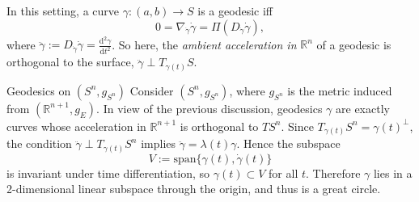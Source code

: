In this setting, a curve $\gamma:(a,b) \to S$ is a geodesic iff
\[
0 = \nabla_{\dot{\gamma}} \dot{\gamma} = \Pi(D_{\dot{\gamma}} \dot{\gamma}),
\]
where $\ddot\gamma:=D_{\dot{\gamma}} \dot{\gamma} = \frac{\mathrm{d}^2\gamma}{\mathrm{d}t^2}$. So here, the \emph{ambient acceleration in} $\mathbb{R}^n$ of a geodesic is orthogonal to the surface, $\ddot\gamma\perp T_{\gamma(t)}S$.


\begin{colexample}{Geodesics on \((S^n, g_{S^n})\)}{}
Consider \((S^n, g_{S^n})\), where \(g_{S^n}\) is the metric induced from \((\mathbb{R}^{n+1}, g_E)\). In view of the previous discussion, geodesics \(\gamma\) are exactly curves whose acceleration in \(\mathbb{R}^{n+1}\) is orthogonal to \(TS^n\). Since \(T_{\gamma(t)}S^n = \gamma(t)^\perp\), the condition \(\ddot\gamma \perp T_{\gamma(t)}S^n\) implies \(\ddot\gamma = \lambda(t)\gamma\). Hence the subspace
\[
V := \mathrm{span}\{\gamma(t), \dot\gamma(t)\}
\]
is invariant under time differentiation, so \(\gamma(t) \subset V\) for all \(t\). Therefore \(\gamma\) lies in a 2-dimensional linear subspace through the origin, and thus is a great circle.
\end{colexample}


\begin{center}
\end{center}

